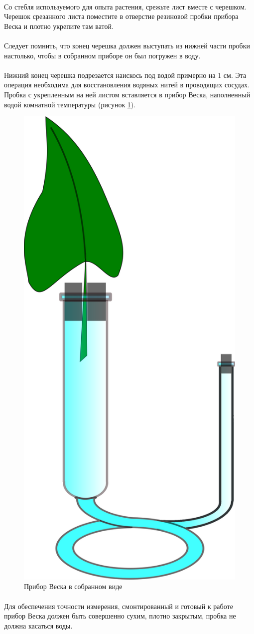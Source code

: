 \paragraph*{}Со стебля используемого для опыта растения, срежьте лист вместе с черешком. Черешок срезанного листа поместите в отверстие резиновой пробки прибора Веска и  плотно укрепите там ватой. 

\paragraph*{\warningsign}Следует помнить, что конец черешка должен выступать из нижней части пробки настолько, чтобы в собранном приборе он был погружен в воду. 

\paragraph*{}Нижний конец черешка подрезается наискось под водой примерно на 1 см. Эта операция необходима для восстановления водяных нитей в проводящих сосудах. Пробка с укрепленным на ней листом вставляется в прибор Веска, наполненный водой комнатной температуры (рисунок \ref{veska}).  

\begin{figure}[h]
  \centering
       \includegraphics[width=0.2\linewidth]{pictures/veska}
\caption{Прибор Веска в собранном виде}
\label{veska}
\end{figure}

\paragraph*{}Для обеспечения точности измерения, смонтированный и готовый к работе прибор Веска должен быть совершенно сухим, плотно закрытым, пробка не должна касаться воды.

